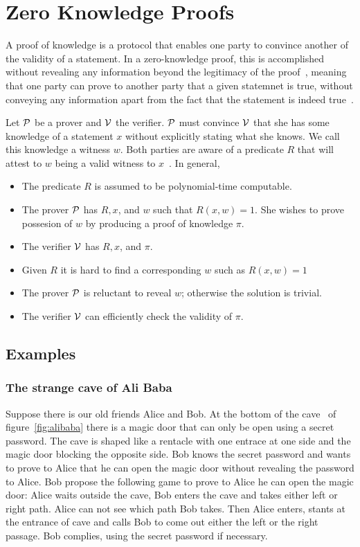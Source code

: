 \chapter{Zero Knowledge Proofs}
\label{zkp}

A proof of knowledge is a protocol that enables one party to convince another of the validity of a statement.
In a zero-knowledge proof, this is accomplished without revealing any information beyond the legitimacy of the proof~\cite{kiagias:crypto},
meaning that one party can prove to another party that a given statemnet is true, without conveying any information apart from
the fact that the statement is indeed true~\cite{wiki:zkp}.

Let $\mathcal{P}$ be a prover and $\mathcal{V}$ the verifier. $\mathcal{P}$ must convince $\mathcal{V}$ that she has some
knowledge of a statement $x$ without explicitly stating what she knows. We call this knowledge a witness $w$.
Both parties are aware of a predicate $R$ that will attest to $w$ being a valid witness to $x$~\cite{kiagias:crypto}. In general,

\begin{itemize}
  \item The predicate $R$ is assumed to be polynomial-time computable.
  \item The prover $\mathcal{P}$ has $R,x$, and $w$ such that $R(x,w) = 1$. She wishes to prove possesion of $w$ by producing a proof of knowledge $\pi$.
  \item The verifier $\mathcal{V}$ has $R,x$, and $\pi$.
  \item Given $R$ it is hard to find a corresponding $w$ such as $R(x,w) = 1$
  \item The prover $\mathcal{P}$ is reluctant to reveal $w$; otherwise the solution is trivial.
  \item The verifier $\mathcal{V}$ can efficiently check the validity of $\pi$.
\end{itemize}

\section{Examples}

\subsection{The strange cave of Ali Baba}

Suppose there is our old friends Alice and Bob. At the bottom of the cave~\cite{Quisquater:1989:EZP:118209.118269} of figure~\ref{fig:alibaba} there is a magic door that
can only be open using a secret password. The cave is shaped like a rentacle with one entrace at one side and the magic door blocking the opposite side.
Bob knows the secret password and wants to prove to Alice that he can open the magic door without revealing the password to Alice.
Bob propose the following game to prove to Alice he can open the magic door: Alice waits outside the cave, Bob enters the cave and
takes either left or right path. Alice can not see which path Bob takes. Then Alice enters, stants at the entrance of cave and calls
Bob to come out either the left or the right passage. Bob complies, using the secret password if necessary.

